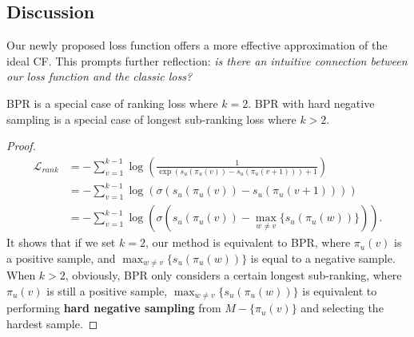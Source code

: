 \subsection{Discussion}
Our newly proposed loss function offers a more effective approximation of the ideal CF. This prompts further reflection: \textit{is there an intuitive connection between our loss function and the classic loss?}
\begin{theorem}
\label{th:3}
BPR is a special case of ranking loss where $k=2$. BPR with hard negative sampling is a special case of longest sub-ranking loss where $k>2$. 
\end{theorem}
\begin{proof}
\begin{align}
\mathcal{L}_{rank} &= -\sum_{v=1}^{k-1} \log\left(\frac{1}{\exp(s_u(\pi_{u}(v)) - s_u(\pi_{u}(v+1))) + 1}\right)\\
&= -\sum_{v=1}^{k-1} \log(\sigma(s_u(\pi_{u}(v)) - s_u(\pi_{u}(v+1)))) \\
&= -\sum_{v=1}^{k-1} \log(\sigma(s_u(\pi_{u}(v)) - \max_{w \neq v}\{s_u(\pi_{u}(w))\})).
\end{align}
It shows that if we set $k=2$, our method is equivalent to BPR, where $\pi_{u}(v)$ is a positive sample, and $\max_{w \neq v}\{s_u(\pi_{u}(w))\}$ is equal to a negative sample. When $k>2$, obviously, BPR only considers a certain longest sub-ranking, where $\pi_{u}(v)$ is still a positive sample, $\max_{w \neq v}\{s_u(\pi_{u}(w))\}$ is equivalent to performing \textbf{hard negative sampling} from $M - \{\pi_{u}(v)\}$ and selecting the hardest sample. 

\end{proof}
